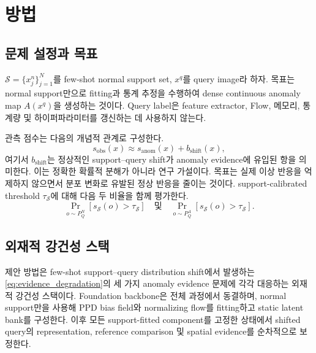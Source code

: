 \section{방법}
\label{sec:method}


\subsection{문제 설정과 목표}
\label{sec:problem_setup}

$\mathcal{S}=\{x_j^n\}_{j=1}^{N}$를 few-shot normal support set, $x^q$를 query
image라 하자. 목표는 normal support만으로 fitting과 통계 추정을 수행하여 dense
continuous anomaly map $A(x^q)$을 생성하는 것이다. Query label은 feature extractor, Flow,
메모리, 통계량 및 하이퍼파라미터를 갱신하는 데 사용하지 않는다.

관측 점수는 다음의 개념적 관계로 구성한다.
\begin{equation}
  s_{\mathrm{obs}}(x)\approx s_{\mathrm{anom}}(x)+b_{\mathrm{shift}}(x),
  \label{eq:shift_score}
\end{equation}
여기서 $b_{\mathrm{shift}}$는 정상적인 support--query shift가 anomaly evidence에 유입된
항을 의미한다. 이는 정확한 확률적 분해가 아니라 연구 가설이다. 목표는 실제
이상 반응을 억제하지 않으면서 분포 변화로 유발된 정상 반응을 줄이는 것이다.
support-calibrated threshold $\tau_{\mathcal S}$에 대해 다음 두 비율을 함께 평가한다.
\begin{equation}
  \Pr_{o\sim P_Q^N}[s_{\mathcal S}(o)>\tau_{\mathcal S}]
  \quad\text{및}\quad
  \Pr_{o\sim P_Q^A}[s_{\mathcal S}(o)>\tau_{\mathcal S}].
  \label{eq:normal_anomaly_rates}
\end{equation}

\subsection{외재적 강건성 스택}
\label{sec:method_overview}

제안 방법은 few-shot support--query distribution shift에서 발생하는
\cref{eq:evidence_degradation}의 세 가지 anomaly evidence 문제에 각각 대응하는
외재적 강건성 스택이다. Foundation backbone은 전체 과정에서 동결하며, normal
support만을 사용해 PPD bias field와 normalizing flow를 fitting하고 static latent
bank를 구성한다. 이후 모든 support-fitted component를 고정한 상태에서 shifted
query의 representation, reference comparison 및 spatial evidence를 순차적으로
보정한다.

